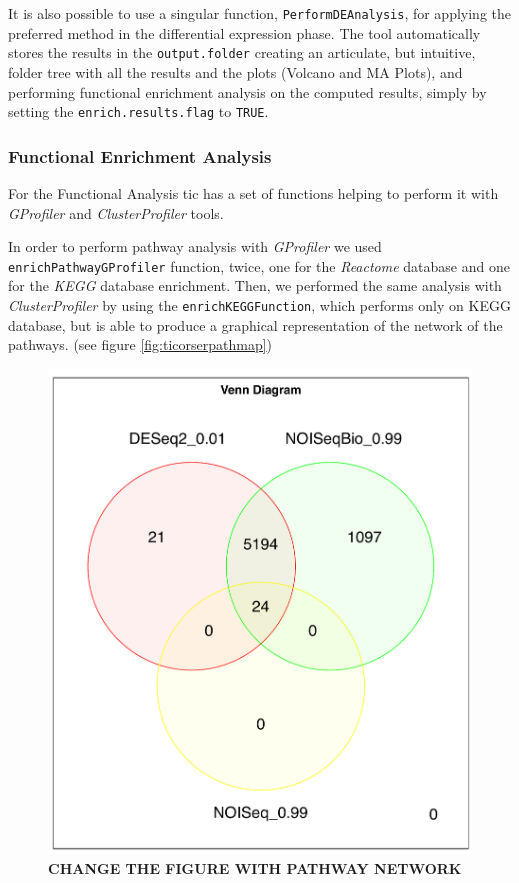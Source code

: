 It is also possible to use a singular function, \lstinline!PerformDEAnalysis!, for applying the preferred method in the differential expression phase. 
The tool automatically stores the results in the \lstinline!output.folder! creating an articulate, but intuitive, folder tree with all the results and the plots (Volcano and MA Plots), and performing functional enrichment analysis on the computed results, simply by setting the \lstinline!enrich.results.flag! to \lstinline!TRUE!.

\subsubsection{Functional Enrichment Analysis}

For the Functional Analysis \gls{tic} has a set of functions helping to perform it with \textit{GProfiler} and \textit{ClusterProfiler} tools.

In order to perform pathway analysis with \textit{GProfiler} we used \lstinline!enrichPathwayGProfiler! function, twice, one for the \textit{Reactome} database and one for the \textit{KEGG} database enrichment.
Then, we performed the same analysis with \textit{ClusterProfiler} by using the \lstinline!enrichKEGGFunction!, which performs only on KEGG database, but is able to produce a graphical representation of the network of the pathways. (see figure \ref{fig:ticorserpathmap})

\begin{figure}[H]
\includegraphics[width=\textwidth,height=\textheight,keepaspectratio]{img/ticorser/de/singleTP/venn.pdf}
\caption[ticorser venn diagram single time point]{\textbf{CHANGE THE FIGURE WITH PATHWAY NETWORK}}
\label{fig:ticorserpathmat}
\centering
\end{figure}

